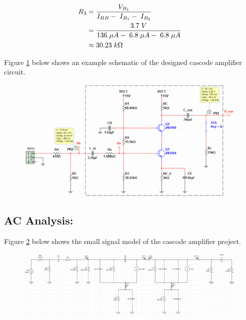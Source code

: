 \documentclass{article}
\begin{document}
	\begin{align*}
		R_3 &= \frac{V_{B_1}}{I_{BB} - \hspace{1mm} I_{B_1} - \hspace{1mm} I_{B_2}}\\
		&= \frac{3.7 \hspace{1mm} V}{136 \hspace{1mm}\mu A - \hspace{1mm} 6.8 \hspace{1mm}\mu A - \hspace{1mm} 6.8 \hspace{1mm}\mu A}\\ 
		&\approx 30.23 \hspace{1mm} k\Omega
	\end{align*}
	
	\pagebreak
	Figure \ref{f2} below shows an example schematic of the designed cascode amplifier circuit.
	\begin{figure}[!ht]
		\centering
		\includegraphics[width=\linewidth]{cascode_schematic_values.png}
		\label{f2}
	\end{figure}
	\pagebreak
	\subsection*{AC Analysis:}
	Figure \ref{f:1} below shows the small signal model of the cascode amplifier project.
	\begin{figure}[!ht]
		\centering
		\includegraphics[width=\linewidth]{ssm.png}
		\label{f:1}
	\end{figure}
	
\end{document}
